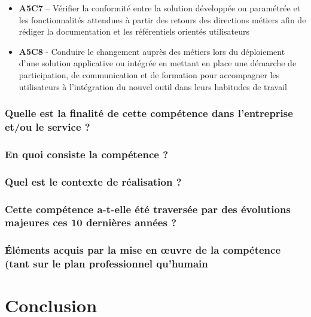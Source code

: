 \documentclass[a4paper, 11pt]{report}
\begin{document}
\begin{itemize}
  \item \textbf{A5C7} – Vérifier la conformité entre la solution développée ou paramétrée et les fonctionnalités attendues à partir des retours des directions métiers afin de rédiger la documentation et les référentiels orientés utilisateurs
  \item \textbf{A5C8} - Conduire le changement auprès des métiers lors du déploiement d’une solution applicative ou intégrée en mettant en place une démarche de participation, de communication et de formation pour accompagner les utilisateurs à l’intégration du nouvel outil dans leurs habitudes de travail
\end{itemize}

\subsection{Quelle est la finalité de cette compétence dans l’entreprise et/ou le service ?}
\subsection{En quoi consiste la compétence ?}
\subsection{Quel est le contexte de réalisation ?}
\subsection{Cette compétence a-t-elle été traversée par des évolutions majeures ces 10 dernières années ?}
\subsection{Éléments acquis par la mise en œuvre de la compétence (tant sur le plan professionnel qu’humain}

\chapter{Conclusion}
\end{document}
